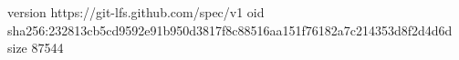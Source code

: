 version https://git-lfs.github.com/spec/v1
oid sha256:232813cb5cd9592e91b950d3817f8c88516aa151f76182a7c214353d8f2d4d6d
size 87544
